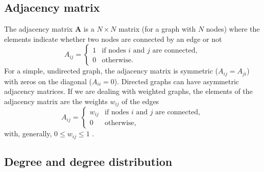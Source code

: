 \documentclass[11 pt , letterpaper , twoside , openright]{book}
\begin{document}
\subsection{Adjacency matrix}

The adjacency matrix \textbf{A} is a $N \times N$ matrix (for a graph with $N$ nodes) where the elements indicate whether two nodes are connected by an edge or not \cite{Mata2020}
\begin{equation}
	A_{ij} = 
	\begin{cases}
		1 & \text{if nodes $i$ and $j$ are connected},\\
		0 & \text{otherwise}.
	\end{cases}
\end{equation}
For a simple, undirected graph, the adjacency matrix is symmetric ($A_{ij} = A_{ji}$) with zeros on the diagonal ($A_{ii} = 0$). Directed graphs can have asymmetric adjacency matrices. If we are dealing with weighted graphs, the elements of the adjacency matrix are the weights $w_{ij}$ of the edges
\begin{equation}
	A_{ij} = 
	\begin{cases}
		w_{ij} & \text{if nodes $i$ and $j$ are connected},\\
		0 & \text{otherwise},
	\end{cases}
\end{equation}
with, generally, $0 \leqslant w_{ij} \leqslant 1$ \cite{Mata2020}. \\
\subsection{Degree and degree distribution}
\end{document}
